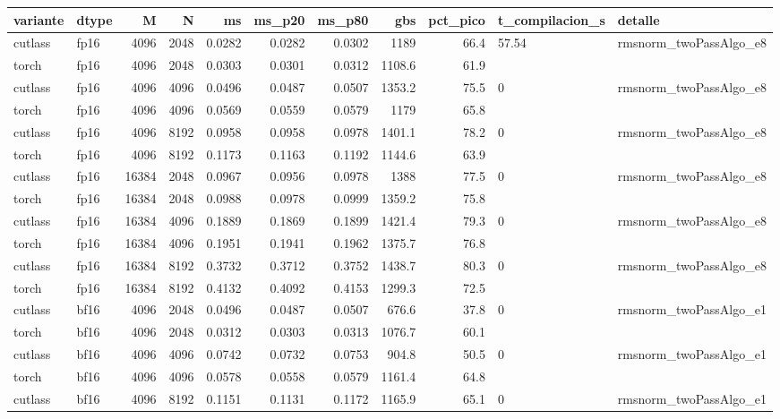 \begin{table}[htbp]
  \centering\small
  \begin{tabular}{llrrrrrrrll}
    \toprule
    variante & dtype & M & N & ms & ms\_p20 & ms\_p80 & gbs & pct\_pico & t\_compilacion\_s & detalle \\
    \midrule
    cutlass & fp16 & 4096 & 2048 & 0.0282 & 0.0282 & 0.0302 & 1189 & 66.4 & 57.54 & rmsnorm\_twoPassAlgo\_e8 \\
    torch & fp16 & 4096 & 2048 & 0.0303 & 0.0301 & 0.0312 & 1108.6 & 61.9 &  &  \\
    cutlass & fp16 & 4096 & 4096 & 0.0496 & 0.0487 & 0.0507 & 1353.2 & 75.5 & 0 & rmsnorm\_twoPassAlgo\_e8 \\
    torch & fp16 & 4096 & 4096 & 0.0569 & 0.0559 & 0.0579 & 1179 & 65.8 &  &  \\
    cutlass & fp16 & 4096 & 8192 & 0.0958 & 0.0958 & 0.0978 & 1401.1 & 78.2 & 0 & rmsnorm\_twoPassAlgo\_e8 \\
    torch & fp16 & 4096 & 8192 & 0.1173 & 0.1163 & 0.1192 & 1144.6 & 63.9 &  &  \\
    cutlass & fp16 & 16384 & 2048 & 0.0967 & 0.0956 & 0.0978 & 1388 & 77.5 & 0 & rmsnorm\_twoPassAlgo\_e8 \\
    torch & fp16 & 16384 & 2048 & 0.0988 & 0.0978 & 0.0999 & 1359.2 & 75.8 &  &  \\
    cutlass & fp16 & 16384 & 4096 & 0.1889 & 0.1869 & 0.1899 & 1421.4 & 79.3 & 0 & rmsnorm\_twoPassAlgo\_e8 \\
    torch & fp16 & 16384 & 4096 & 0.1951 & 0.1941 & 0.1962 & 1375.7 & 76.8 &  &  \\
    cutlass & fp16 & 16384 & 8192 & 0.3732 & 0.3712 & 0.3752 & 1438.7 & 80.3 & 0 & rmsnorm\_twoPassAlgo\_e8 \\
    torch & fp16 & 16384 & 8192 & 0.4132 & 0.4092 & 0.4153 & 1299.3 & 72.5 &  &  \\
    cutlass & bf16 & 4096 & 2048 & 0.0496 & 0.0487 & 0.0507 & 676.6 & 37.8 & 0 & rmsnorm\_twoPassAlgo\_e1 \\
    torch & bf16 & 4096 & 2048 & 0.0312 & 0.0303 & 0.0313 & 1076.7 & 60.1 &  &  \\
    cutlass & bf16 & 4096 & 4096 & 0.0742 & 0.0732 & 0.0753 & 904.8 & 50.5 & 0 & rmsnorm\_twoPassAlgo\_e1 \\
    torch & bf16 & 4096 & 4096 & 0.0578 & 0.0558 & 0.0579 & 1161.4 & 64.8 &  &  \\
    cutlass & bf16 & 4096 & 8192 & 0.1151 & 0.1131 & 0.1172 & 1165.9 & 65.1 & 0 & rmsnorm\_twoPassAlgo\_e1 \\

\end{tabular}
\end{table}
